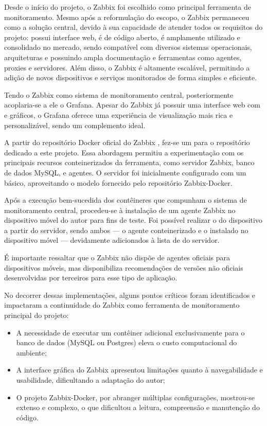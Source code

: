 Desde o início do projeto, o Zabbix foi escolhido como principal ferramenta de monitoramento. Mesmo após a reformulação do escopo, o Zabbix permaneceu como a solução central, devido à sua capacidade de atender todos os requisitos do projeto: possui interface web, é de código aberto, é amplamente utilizado e consolidado no mercado, sendo compatível com diversos sistemas operacionais, arquiteturas e possuindo ampla documentação e ferramentas como agentes, proxies e servidores. Além disso, o Zabbix é altamente escalável, permitindo a adição de novos dispositivos e serviços monitorados de forma simples e eficiente.

Tendo o Zabbix como sistema de monitoramento central, posteriormente aco\-plaria-se a ele o Grafana. Apesar do Zabbix já possuir uma interface web com  e gráficos, o Grafana oferece uma experiência de visualização mais rica e personalizável, sendo um complemento ideal.

A partir do repositório Docker oficial do Zabbix  \citep{zabbixdocker2025}, fez-se um  para o repositório dedicado a este projeto. Essa abordagem permitiu a experimentação com os principais recursos conteinerizados da ferramenta, como servidor Zabbix, banco de dados MySQL, e agentes. O servidor foi inicialmente configurado com um  básico, aproveitando o modelo fornecido pelo repositório Zabbix-Docker.

Após a execução bem-sucedida dos contêineres que compunham o sistema de monitoramento central, procedeu-se à instalação de um agente Zabbix no dispositivo móvel do autor para fins de teste. Foi possível realizar o  do dispositivo a partir do servidor, sendo ambos — o agente conteinerizado e o instalado no dispositivo móvel — devidamente adicionados à lista de  do servidor.

É importante ressaltar que o Zabbix não dispõe de agentes oficiais para dispositivos móveis, mas disponibiliza recomendações de versões não oficiais desenvolvidas por terceiros para esse tipo de aplicação.

No decorrer dessas implementações, alguns pontos críticos foram identificados e impactaram a continuidade do Zabbix como ferramenta de monitoramento principal do projeto:

\begin{itemize}
\item A necessidade de executar um contêiner adicional exclusivamente para o banco de dados (MySQL ou Postgres) eleva o custo computacional do ambiente;
\item A interface gráfica do Zabbix apresentou limitações quanto à navegabilidade e usabilidade, dificultando a adaptação do autor;
\item O projeto Zabbix-Docker, por abranger múltiplas configurações, mostrou-se extenso e complexo, o que dificultou a leitura, compreensão e manutenção do código.
\end{itemize}

